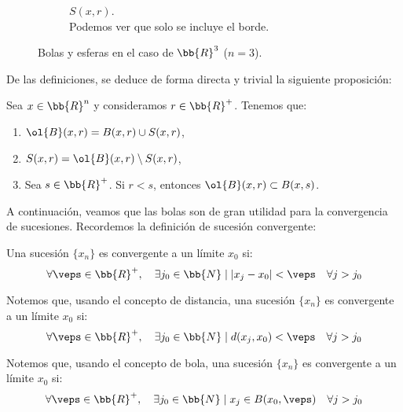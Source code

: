 \begin{ejemplo}
\begin{enumerate}
\begin{samepage}
\begin{figure}[H]
\begin{subfigure}[b]{0.3\textwidth}
                \caption{$S(x,r)$. \\{\centering Podemos ver que solo se incluye el borde.}}
            \end{subfigure}
            \caption{Bolas y esferas en el caso de $\bb{R}^3$ ($n=3$).}
        \end{figure}
        \end{samepage}
    \end{enumerate}
\end{ejemplo}


De las definiciones, se deduce de forma directa y trivial la siguiente proposición:
\begin{prop}
    Sea $x\in \bb{R}^n$ y consideramos $r\in \bb{R}^+$. Tenemos que:
    \begin{enumerate}
        \item $\ol{B}(x,r)=B(x,r)\cup S(x,r)$,
        \item $S(x,r)=\ol{B}(x,r)\setminus S(x,r)$,
        \item Sea $s\in \bb{R}^+$. Si $r<s$, entonces $\ol{B}(x,r)\subset B(x,s)$.
    \end{enumerate}
\end{prop}

A continuación, veamos que las bolas son de gran utilidad para la convergencia de sucesiones. Recordemos la definición de sucesión convergente:
\begin{definicion}
    Una sucesión $\{x_n\}$ es convergente a un límite $x_0$ si:
    \begin{equation*}
        \forall \veps\in \bb{R}^+,\quad \exists j_0\in \bb{N}\mid |x_j-x_0|<\veps \quad \forall j>j_0 
    \end{equation*}
\end{definicion}

\begin{observacion}
    Notemos que, usando el concepto de distancia, una sucesión $\{x_n\}$ es convergente a un límite $x_0$ si:
    \begin{equation*}
        \forall \veps\in \bb{R}^+,\quad \exists j_0\in \bb{N}\mid d(x_j,x_0)<\veps \quad \forall j>j_0 
    \end{equation*}

    Notemos que, usando el concepto de bola, una sucesión $\{x_n\}$ es convergente a un límite $x_0$ si:
        \begin{equation*}
            \forall \veps\in \bb{R}^+,\quad \exists j_0\in \bb{N}\mid x_j\in B(x_0,\veps) \quad \forall j>j_0 
        \end{equation*}
\end{observacion}


